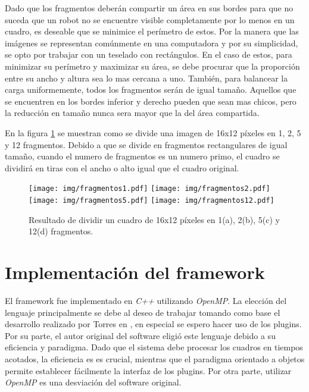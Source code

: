 Dado que los fragmentos deberán compartir un área en sus bordes para que no
suceda que un robot no se encuentre visible completamente por lo menos en un
cuadro, es deseable que se minimice el perímetro de estos. Por la manera que las
imágenes se representan comúnmente en una computadora y por su simplicidad, se
opto por trabajar con un teselado con rectángulos. En el caso de estos, para
minimizar su perímetro y maximizar su área, se debe procurar que la proporción
entre su ancho y altura sea lo mas cercana a uno. También, para balancear la
carga uniformemente, todos los fragmentos serán de igual tamaño. Aquellos que se
encuentren en los bordes inferior y derecho pueden que sean mas chicos, pero la
reducción en tamaño nunca sera mayor que la del área compartida.

En la figura \ref{fragmentos} se muestran como se divide una imagen de 16x12
píxeles en 1, 2, 5 y 12 fragmentos. Debido a que se divide en fragmentos
rectangulares de igual tamaño, cuando el numero de fragmentos es un numero
primo, el cuadro se dividirá en tiras con el ancho o alto igual que el cuadro
original.

\begin{figure}[!h]

	\texttt{[image: img/fragmentos1.pdf]}
	\texttt{[image: img/fragmentos2.pdf]}
	\texttt{[image: img/fragmentos5.pdf]}
	\texttt{[image: img/fragmentos12.pdf]}
	\caption{Resultado de dividir un cuadro de 16x12 píxeles en 1(a), 2(b),
	5(c) y 12(d) fragmentos.}
	\label{fragmentos}

\end{figure}


\section{Implementación del framework}

El framework fue implementado en \emph{C++} utilizando \emph{OpenMP}. La
elección del lenguaje principalmente se debe al deseo de trabajar tomando como
base el desarrollo realizado por Torres en \cite{torres2014}, en especial se
espero hacer uso de los plugins. Por su parte, el autor original del software
eligió este lenguaje debido a su eficiencia y paradigma. Dado que el sistema
debe procesar los cuadros en tiempos acotados, la eficiencia es es crucial,
mientras que el paradigma orientado a objetos permite establecer fácilmente la
interfaz de los plugins. Por otra parte, utilizar \emph{OpenMP} es una
desviación del software original.


